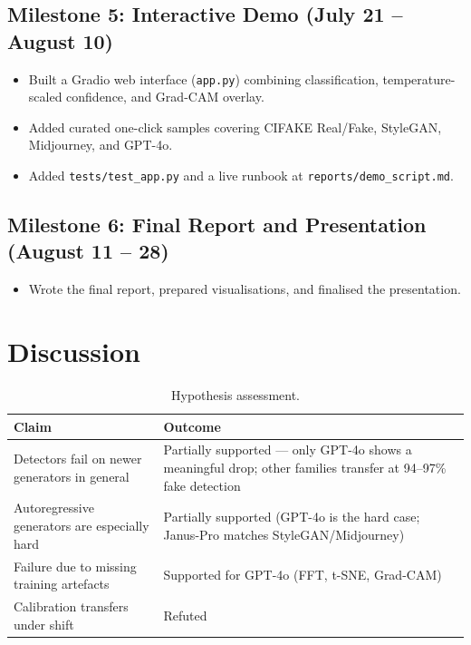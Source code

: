 \documentclass[12pt,a4paper]{article}
\begin{document}
\subsection{Milestone 5: Interactive Demo (July 21 -- August 10)}

\begin{itemize}[noitemsep]
    \item Built a Gradio web interface (\texttt{app.py}) combining classification, temperature-scaled confidence, and Grad-CAM overlay.
    \item Added curated one-click samples covering CIFAKE Real/Fake, StyleGAN, Midjourney, and GPT-4o.
    \item Added \texttt{tests/test\_app.py} and a live runbook at \texttt{reports/demo\_script.md}.
\end{itemize}

\subsection{Milestone 6: Final Report and Presentation (August 11 -- 28)}

\begin{itemize}[noitemsep]
    \item Wrote the final report, prepared visualisations, and finalised the presentation.
\end{itemize}

\section{Discussion}

\begin{table}[H]
\centering
\caption{Hypothesis assessment.}
\label{tab:hyp}
\begin{tabular}{p{7cm}p{5.5cm}}
\toprule
\textbf{Claim} & \textbf{Outcome} \\
\midrule
Detectors fail on newer generators in general & Partially supported --- only GPT-4o shows a meaningful drop; other families transfer at 94--97\% fake detection \\
Autoregressive generators are especially hard & Partially supported (GPT-4o is the hard case; Janus-Pro matches StyleGAN/Midjourney) \\
Failure due to missing training artefacts & Supported for GPT-4o (FFT, t-SNE, Grad-CAM) \\
Calibration transfers under shift & Refuted \\
\bottomrule
\end{tabular}
\end{table}
\end{document}
